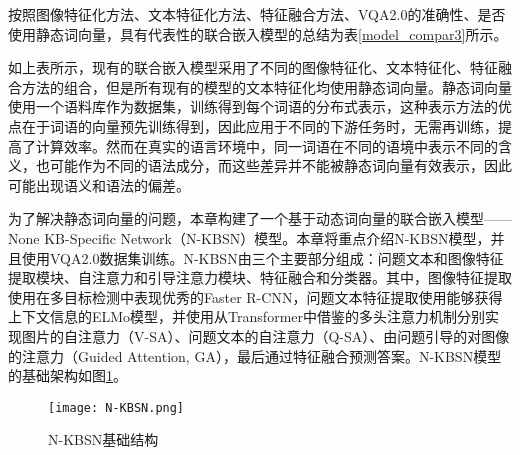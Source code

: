 按照图像特征化方法、文本特征化方法、特征融合方法、VQA2.0的准确性、是否使用静态词向量，具有代表性的联合嵌入模型的总结为表\ref{model_compar3}所示。
\begin{table}[H]
\centering
\caption{代表性联合嵌入模型的比较}
\label{model_compar3}
\end{table}

如上表所示，现有的联合嵌入模型采用了不同的图像特征化、文本特征化、特征融合方法的组合，但是所有现有的模型的文本特征化均使用静态词向量。静态词向量使用一个语料库作为数据集，训练得到每个词语的分布式表示，这种表示方法的优点在于词语的向量预先训练得到，因此应用于不同的下游任务时，无需再训练，提高了计算效率。然而在真实的语言环境中，同一词语在不同的语境中表示不同的含义，也可能作为不同的语法成分，而这些差异并不能被静态词向量有效表示，因此可能出现语义和语法的偏差。

为了解决静态词向量的问题，本章构建了一个基于动态词向量的联合嵌入模型——None KB-Specific Network（N-KBSN）模型。本章将重点介绍N-KBSN模型，并且使用VQA2.0数据集训练。N-KBSN由三个主要部分组成：问题文本和图像特征提取模块、自注意力和引导注意力模块、特征融合和分类器。其中，图像特征提取使用在多目标检测中表现优秀的Faster R-CNN，问题文本特征提取使用能够获得上下文信息的ELMo模型，并使用从Transformer中借鉴的多头注意力机制分别实现图片的自注意力（V-SA）、问题文本的自注意力（Q-SA）、由问题引导的对图像的注意力（Guided Attention, GA），最后通过特征融合预测答案。N-KBSN模型的基础架构如图\ref{N-KBSN}。
\begin{figure}[H]
	\texttt{[image: N-KBSN.png]}
	\caption{N-KBSN基础结构}
	\label{N-KBSN}
\end{figure}

